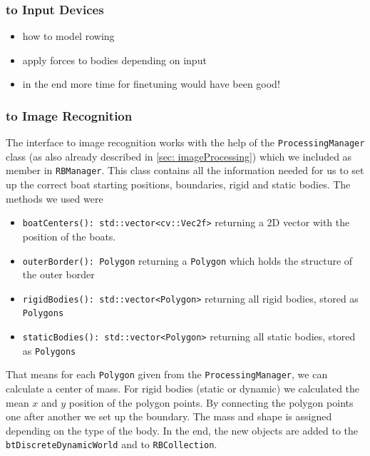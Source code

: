 \subsubsection{to Input Devices}
\begin{itemize}
\item how to model rowing
\item apply forces to bodies depending on input
\item in the end more time for finetuning would have been good!
\end{itemize}
\subsubsection{to Image Recognition}
The interface to image recognition works with the help of the \texttt{ProcessingManager} class (as also already described in \autoref{sec: imageProcessing}) which we included as member in \texttt{RBManager}. This class contains all the information needed for us to set up the correct boat starting positions, boundaries, rigid and static bodies. The methods we used were
\begin{itemize}
\item \texttt{boatCenters(): std::vector<cv::Vec2f>} returning a 2D vector with the position of the boats.
\item \texttt{outerBorder(): Polygon} returning a \texttt{Polygon} which holds the structure of the outer border
\item \texttt{rigidBodies(): std::vector<Polygon>} returning all rigid bodies, stored as \texttt{Polygons}
\item \texttt{staticBodies(): std::vector<Polygon>} returning all static bodies, stored as \texttt{Polygons}
\end{itemize} 
That means for each \texttt{Polygon} given from the \texttt{ProcessingManager}, we can calculate a center of mass. For rigid bodies (static or dynamic) we calculated the mean $x$ and $y$ position of the polygon points. By connecting the polygon points one after another we set up the boundary. The mass and shape is assigned depending on the type of the body. In the end, the new objects are added to the \texttt{btDiscreteDynamicWorld} and to \texttt{RBCollection}.
